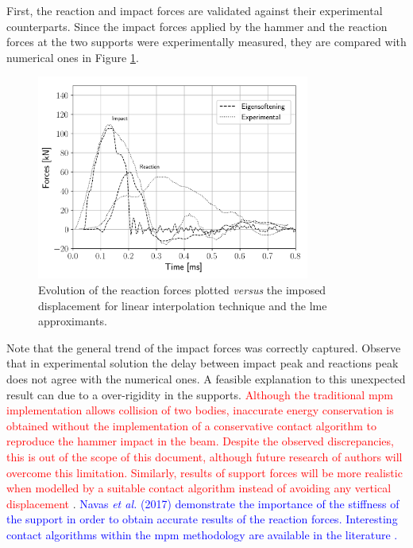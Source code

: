 \message{ !name(2020_EFM_MPM_Eigensoftening.tex)}\documentclass[preprint,12pt,a4paper]{elsarticle}
\newcommand{\PNA}[1]{
  \textcolor{red}{{#1}}
}
\newcommand{\MMP}[1]{
  \textcolor{blue}{{#1}}
}
\begin{document}
First, the reaction and impact forces are validated against their
experimental counterparts. Since the impact forces applied by the
hammer and the reaction forces at the two supports were experimentally
measured, they are compared with numerical ones in Figure
\ref{fig:Reactions-Forces-impact-test}. 
\begin{figure}
  \centering
  \includegraphics[width=0.8\textwidth]{Figure-impact-test-Forces-Time}
  \caption{Evolution of the reaction forces plotted \textit{versus}
    the imposed displacement for linear interpolation technique and
    the \acrshort{lme} approximants.}
  \label{fig:Reactions-Forces-impact-test}
\end{figure}
Note that the general trend of the impact forces was correctly
captured. Observe that in experimental solution the delay between
impact peak and reactions peak does not agree with the numerical
ones. A feasible explanation to this unexpected result can due to a
over-rigidity in the supports. \PNA{Although the traditional \acrshort{mpm} implementation allows collision of two bodies, inaccurate energy conservation is obtained without the implementation of a conservative contact algorithm to reproduce the hammer impact in the beam.
Despite the observed discrepancies, this is out of the scope of this
document, although future research of authors will overcome this
limitation. Similarly, results of support forces will be more
realistic when modelled by a suitable contact algorithm instead of
avoiding any vertical displacement}.\MMP{Navas {\it et al.}
(2017)\cite{Navas_2017_ES} demonstrate the importance of the stiffness
of the support in order to obtain accurate results of the reaction
forces. Interesting contact algorithms within the \acrshort{mpm}
methodology are available in the literature
\cite{Bardenhagen_Contact_2001,XZhang_Contact_2011}.}
\end{document}
